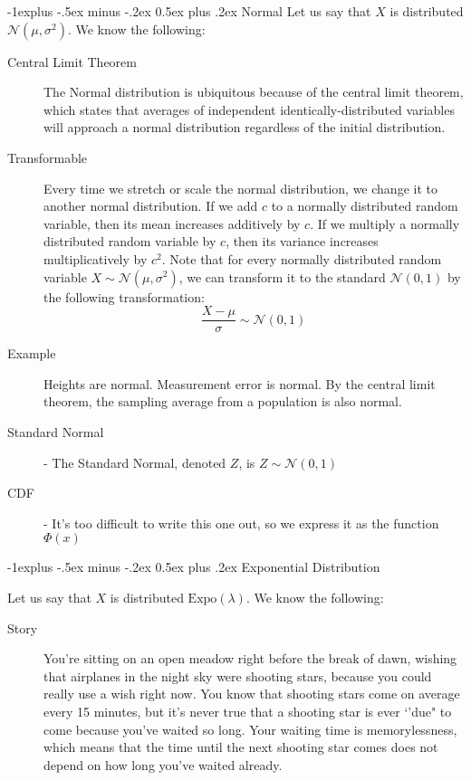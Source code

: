\documentclass[10pt,landscape]{article}
\makeatletter
\newcommand{\N}{\mathcal{N}}
\newcommand{\Expo}{\textrm{Expo}}
\renewcommand{\subsection}{\@startsection{subsection}{2}{0mm}%
                                {-1explus -.5ex minus -.2ex}%
                                {0.5ex plus .2ex}%
                                {\normalfont\normalsize\bfseries}}
\makeatother
\begin{document}
\begin{multicols}{3}
\begin{description}
    
\end{description}

\subsection{Normal} Let us say that $X$ is distributed $\N(\mu, \sigma^2)$. We know the following:
\begin{description}
    \item[Central Limit Theorem] The Normal distribution is ubiquitous because of the central limit theorem, which states that averages of independent identically-distributed variables will approach a normal distribution regardless of the initial distribution.
    \item[Transformable] Every time we stretch or scale the normal distribution, we change it to another normal distribution. If we add $c$ to a normally distributed random variable, then its mean increases additively by $c$. If we multiply a normally distributed random variable by $c$, then its variance increases multiplicatively by $c^2$. Note that for every normally distributed random variable $X \sim \N(\mu, \sigma^2)$, we can transform it to the standard $\N(0, 1)$ by the following transformation:
    \[\frac{X - \mu}{\sigma} \sim \N(0, 1) \]
    \item[Example] Heights are normal. Measurement error is normal. By the central limit theorem, the sampling average from a population is also normal.
    \item[Standard Normal] - The Standard Normal, denoted $Z$, is $Z \sim \N(0, 1)$
    \item[CDF] - It's too difficult to write this one out, so we express it as the function $\Phi(x)$
\end{description}

\subsection{Exponential Distribution}

Let us say that $X$ is distributed $\Expo(\lambda)$. We know the following:
\begin{description}
    \item[Story] You're sitting on an open meadow right before the break of dawn, wishing that airplanes in the night sky were shooting stars, because you could really use a wish right now. You know that shooting stars come on average every 15 minutes, but it's never true that a shooting star is ever `'due" to come because you've waited so long. Your waiting time is memorylessness, which means that the time until the next shooting star comes does not depend on how long you've waited already.
    

\end{description}
\end{multicols}
\end{document}
